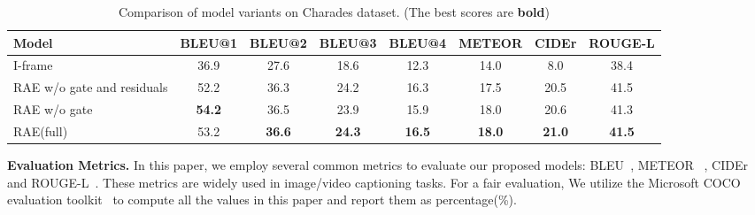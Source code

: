 \documentclass[a4paper,conference]{IEEEtran}
\begin{document}
\begin{table*}[htb]
\normalsize
	\centering
	\caption{Comparison of model variants on Charades dataset. (The best scores are \textbf{bold})}

	\begin{tabular}{l|c|c|c|c|c|c|c}
		\hline
		{Model} & BLEU@1 & BLEU@2 & BLEU@3 & BLEU@4 & METEOR & CIDEr & ROUGE-L\\ 
		\hline
		{I-frame} &36.9 &27.6 &18.6 &12.3 &14.0 &8.0 &38.4\\
		\hline
        {RAE w/o gate and residuals} &{52.2} &{36.3}  &{24.2} &{16.3} &{17.5}  &{20.5} &{41.5}\\
 		\hline
		{{RAE w/o gate}}  &\textbf{54.2} &36.5 &{23.9} &15.9 &18.0 &{20.6} &41.3\\
		\hline
		{{RAE(full)}} &{53.2} & \textbf{36.6} & \textbf{24.3} & \textbf{16.5} & \textbf{18.0} & \textbf{21.0} & \textbf{41.5}\\
		\hline
	\end{tabular}%
	\label{tab:model varient charades}%
\end{table*}%

\noindent\textbf{Evaluation Metrics.} In this paper, we employ several common metrics to evaluate our proposed models: BLEU~\cite{papineni2002bleu}, METEOR ~\cite{denkowski2014meteor}, CIDEr~\cite{vedantam2015cider} and ROUGE-L~\cite{lin2004automatic}. These metrics are widely used in image/video captioning tasks. For a fair evaluation, We utilize the Microsoft COCO evaluation toolkit~\cite{chen2015microsoft} to compute all the values in this paper and report them as percentage(\%).
 
    
\end{document}
